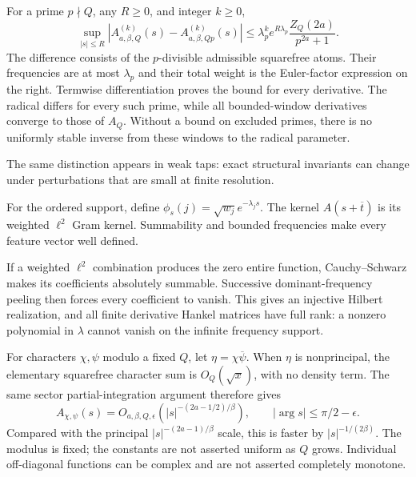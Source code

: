 For a prime $p\nmid Q$, any $R\ge0$, and integer $k\ge0$,
\[
\boxed{\sup_{|s|\le R}|A_{a,\beta,Q}^{(k)}(s)-A_{a,\beta,Qp}^{(k)}(s)|
\le\lambda_p^k e^{R\lambda_p}\frac{Z_Q(2a)}{p^{2a}+1}.}
\]
The difference consists of the $p$-divisible admissible squarefree atoms.
Their frequencies are at most $\lambda_p$ and their total weight is the
Euler-factor expression on the right. Termwise differentiation proves the
bound for every derivative.
The radical differs for every such prime, while all bounded-window derivatives
converge to those of $A_Q$. Without a bound on excluded primes, there is no
uniformly stable inverse from these windows to the radical parameter.

The same distinction appears in weak taps: exact structural invariants can
change under perturbations that are small at finite resolution.

For the ordered support, define $\phi_s(j)=\sqrt{w_j}e^{-\lambda_js}$.
The kernel $A(s+\overline t)$ is its weighted $\ell^2$ Gram kernel.
Summability and bounded frequencies make every feature vector well defined.

If a weighted $\ell^2$ combination produces the zero entire function,
Cauchy--Schwarz makes its coefficients absolutely summable. Successive
dominant-frequency peeling then forces every coefficient to vanish. This
gives an injective Hilbert realization, and all finite derivative Hankel
matrices have full rank: a nonzero polynomial in $\lambda$ cannot vanish
on the infinite frequency support.

For characters $\chi,\psi$ modulo a fixed $Q$, let
$\eta=\chi\overline\psi$. When $\eta$ is nonprincipal, the elementary
squarefree character sum is $O_Q(\sqrt x)$, with no density term.
The same sector partial-integration argument therefore gives
\[
A_{\chi,\psi}(s)
=O_{a,\beta,Q,\epsilon}(|s|^{-(2a-1/2)/\beta}),
\qquad |\arg s|\le\pi/2-\epsilon.
\]
Compared with the principal $|s|^{-(2a-1)/\beta}$ scale, this is faster
by $|s|^{-1/(2\beta)}$. The modulus is fixed; the constants are not asserted uniform as $Q$ grows. Individual off-diagonal functions can be complex and are not asserted
completely monotone.

